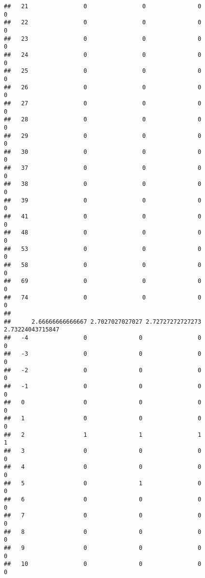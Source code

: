 \documentclass[]{article}
\begin{document}
\begin{verbatim}
##   21                0                0               0                0
##   22                0                0               0                0
##   23                0                0               0                0
##   24                0                0               0                0
##   25                0                0               0                0
##   26                0                0               0                0
##   27                0                0               0                0
##   28                0                0               0                0
##   29                0                0               0                0
##   30                0                0               0                0
##   37                0                0               0                0
##   38                0                0               0                0
##   39                0                0               0                0
##   41                0                0               0                0
##   48                0                0               0                0
##   53                0                0               0                0
##   58                0                0               0                0
##   69                0                0               0                0
##   74                0                0               0                0
##     
##      2.66666666666667 2.7027027027027 2.72727272727273 2.73224043715847
##   -4                0               0                0                0
##   -3                0               0                0                0
##   -2                0               0                0                0
##   -1                0               0                0                0
##   0                 0               0                0                0
##   1                 0               0                0                0
##   2                 1               1                1                1
##   3                 0               0                0                0
##   4                 0               0                0                0
##   5                 0               1                0                0
##   6                 0               0                0                0
##   7                 0               0                0                0
##   8                 0               0                0                0
##   9                 0               0                0                0
##   10                0               0                0                0

\end{verbatim}
\end{document}
